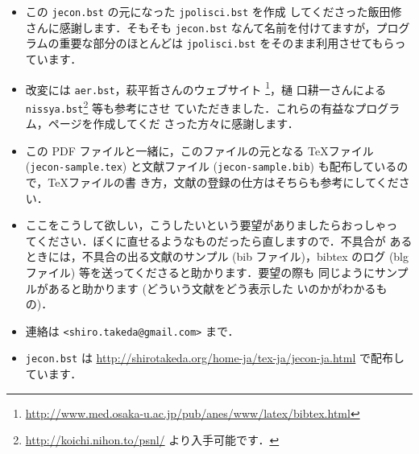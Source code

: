 \documentclass[a4j,10pt]{jarticle}
\begin{document}
\begin{itemize}
 \item この \texttt{jecon.bst} の元になった \texttt{jpolisci.bst} を作成
       してくださった飯田修さんに感謝します．そもそも \texttt{jecon.bst} 
       なんて名前を付けてますが，プログラムの重要な部分のほとんどは
       \texttt{jpolisci.bst} をそのまま利用させてもらっています．
 \item 改変には \texttt{aer.bst}，萩平哲さんのウェブサイト
       \footnote{
       \url{http://www.med.osaka-u.ac.jp/pub/anes/www/latex/bibtex.html}}，樋
       口耕一さんによる \texttt{nissya.bst}\footnote{
       \url{http://koichi.nihon.to/psnl/} より入手可能です．} 等も参考にさせ
       ていただきました．これらの有益なプログラム，ページを作成してくだ
       さった方々に感謝します．
 \item この PDF ファイルと一緒に，このファイルの元となる \TeX ファイル 
       (\texttt{jecon-sample.tex}) と文献ファイル 
       (\texttt{jecon-sample.bib}) も配布しているので，\TeX ファイルの書
       き方，文献の登録の仕方はそちらも参考にしてください．
 \item ここをこうして欲しい，こうしたいという要望がありましたらおっしゃっ
       てください．ぼくに直せるようなものだったら直しますので．不具合が
       あるときには，不具合の出る文献のサンプル (bib ファイル)，bibtex 
       のログ (blg ファイル) 等を送ってくださると助かります．要望の際も
       同じようにサンプルがあると助かります (どういう文献をどう表示した
       いのかがわかるもの)．
 \item 連絡は \verb|<shiro.takeda@gmail.com>| まで．
 \item \texttt{jecon.bst} は 
       \url{http://shirotakeda.org/home-ja/tex-ja/jecon-ja.html} で配布しています．
\end{itemize}

\nocite{*}

% 


%

% 
\end{document}

